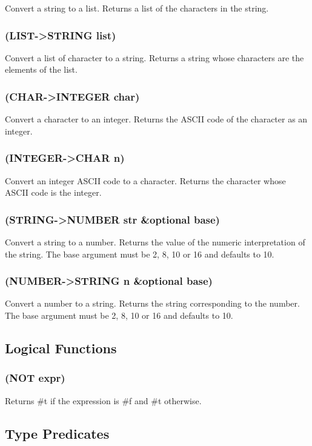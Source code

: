 \documentclass[11pt]{article}
\begin{document}
Convert a string to a list.  Returns a list of the characters in the
string.
\subsubsection{(LIST->STRING list)}
\label{sec-4-21-6}

Convert a list of character to a string.  Returns a string whose
characters are the elements of the list.
\subsubsection{(CHAR->INTEGER char)}
\label{sec-4-21-7}

Convert a character to an integer.  Returns the ASCII code of the
character as an integer.
\subsubsection{(INTEGER->CHAR n)}
\label{sec-4-21-8}

Convert an integer ASCII code to a character.  Returns the character
whose ASCII code is the integer.
\subsubsection{(STRING->NUMBER str \&optional base)}
\label{sec-4-21-9}

Convert a string to a number.  Returns the value of the numeric
interpretation of the string.  The base argument must be 2, 8, 10 or
16 and defaults to 10.
\subsubsection{(NUMBER->STRING n \&optional base)}
\label{sec-4-21-10}

Convert a number to a string.  Returns the string corresponding to
the number.  The base argument must be 2, 8, 10 or 16 and defaults
to 10.
\subsection{Logical Functions}
\label{sec-4-22}

\subsubsection{(NOT expr)}
\label{sec-4-22-1}

Returns \#t if the expression is \#f and \#t otherwise.
\subsection{Type Predicates}
\label{sec-4-23}
\end{document}
